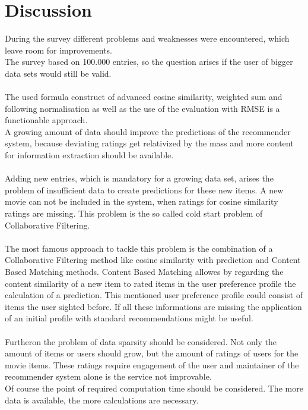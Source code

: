 \documentclass[a4paper,12pt,twoside]{article}
\begin{document}
\section{Discussion}
During the survey different problems and weaknesses were encountered, which leave room for improvements.\\
The survey based on 100.000 entries, so the question arises if the user of bigger data sets would still be valid.\\
\\
The used formula construct of advanced cosine similarity, weighted sum and following normalisation as well as the use of the evaluation with RMSE is a functionable approach.\\
A growing amount of data should improve the predictions of the recommender system, because deviating ratings get relativized by the mass and more content for information extraction should be available.\\ 
\\
Adding new entries, which is mandatory for a growing data set, arises the problem of insufficient data to create predictions for these new items. A new movie can not be included in the system, when ratings for cosine similarity ratings are missing. This problem is the so called cold start problem of Collaborative Filtering.\\
\\
The most famous approach to tackle this problem is the combination of a Collaborative Filtering method like cosine similarity with prediction and Content Based Matching methods. Content Based Matching allowes by regarding the content similarity of a new item to rated items in the user preference profile the calculation of a prediction. This mentioned user preference profile could consist of items the user sighted before. If all these informations are missing the application of an initial profile with standard recommendations might be useful.\\
\\
Furtheron the problem of data sparsity should be considered. Not only the amount of items or users should grow, but the amount of ratings of users for the movie items. These ratings require engagement of the user and maintainer of the recommender system alone is the service not improvable.\\
Of course the point of required computation time should be considered. The more data is available, the more calculations are necessary.\\
\\
\end{document}
